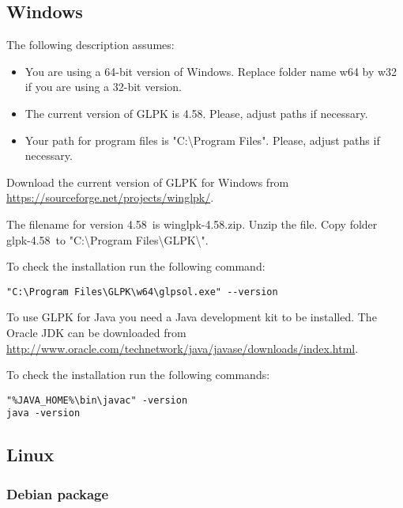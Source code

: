 \documentclass[a4paper,11pt]{report}
\newcommand{\glpkVersionMajor}{4}
\newcommand{\glpkVersionMinor}{58}
\begin{document}
\subsection{Windows}

The following description assumes:

\begin{itemize}
\item You are using a 64-bit version of Windows. Replace folder name w64 by w32
if you are using a 32-bit version.
\item The current version of GLPK is \glpkVersionMajor.\glpkVersionMinor.
Please, adjust paths if necessary.
\item Your path for program files is "C:\textbackslash Program Files".
Please, adjust paths if necessary.
\end{itemize}

Download the current version of GLPK for Windows from \href{https://sourceforge.net/projects/winglpk/}{https://sourceforge.net/projects/winglpk/}.

The filename for version \glpkVersionMajor.\glpkVersionMinor\ is winglpk-\glpkVersionMajor.\glpkVersionMinor.zip. Unzip the file. Copy folder glpk-\glpkVersionMajor.\glpkVersionMinor\ to "C:\textbackslash Program Files\textbackslash GLPK\textbackslash ".

To check the installation run the following command:

\begin{lstlisting}
"C:\Program Files\GLPK\w64\glpsol.exe" --version
\end{lstlisting}

To use GLPK for Java you need a Java development kit to be installed.
The Oracle JDK can be downloaded from
\href{http://www.oracle.com/technetwork/java/javase/downloads/index.html}{http://www.oracle.com/technetwork/java/javase/downloads/index.html}.

To check the installation run the following commands:

\begin{lstlisting}
"%JAVA_HOME%\bin\javac" -version
java -version
\end{lstlisting}

\subsection{Linux}
\subsubsection{Debian package}
\end{document}
